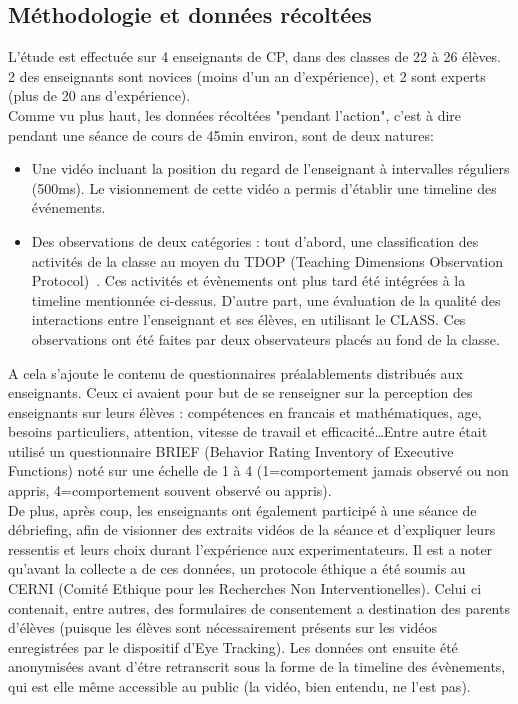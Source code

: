 \documentclass{article}
\begin{document}
\subsection{Méthodologie et données récoltées}
L'étude est effectuée sur 4 enseignants de CP, dans des classes de 22 à 26 élèves. 2 des enseignants sont novices (moins d'un an d'expérience), et 2 sont experts (plus de 20 ans d'expérience).\\
Comme vu plus haut, les données récoltées "pendant l'action", c'est à dire pendant une séance de cours de 45min environ, sont de deux natures:
\begin{itemize}
  \item Une vidéo incluant la position du regard de l'enseignant à intervalles réguliers (500ms). Le visionnement de cette vidéo a permis d'établir une timeline des événements.
  \item Des observations de deux catégories : tout d'abord, une classification des activités de la classe au moyen du TDOP (Teaching Dimensions Observation Protocol)~\cite{TDOP}. Ces activités et évènements ont plus tard été intégrées à la timeline mentionnée ci-dessus. D'autre part, une évaluation de la qualité des interactions entre l'enseignant et ses élèves, en utilisant le CLASS. Ces observations ont été faites par deux observateurs placés au fond de la classe.
\end{itemize}
A cela s'ajoute le contenu de questionnaires préalablements distribués aux enseignants. Ceux ci avaient pour but de se renseigner sur la perception des enseignants sur leurs élèves : compétences en francais et mathématiques, age, besoins particuliers, attention, vitesse de travail et efficacité\ldots Entre autre était utilisé un questionnaire BRIEF (Behavior Rating Inventory of Executive Functions) noté sur une échelle de 1 à 4 (1=comportement jamais observé ou non appris, 4=comportement souvent observé ou appris).\\
De plus, après coup, les enseignants ont également participé à une séance de débriefing, afin de visionner des extraits vidéos de la séance et d'expliquer leurs ressentis et leurs choix durant l'expérience aux experimentateurs.
Il est a noter qu'avant la collecte a de ces données, un protocole éthique a été soumis au CERNI (Comité Ethique pour les Recherches Non Interventionelles). Celui ci contenait, entre autres, des formulaires de consentement a destination des parents d'élèves (puisque les élèves sont nécessairement présents sur les vidéos enregistrées par le dispositif d'Eye Tracking). Les données ont ensuite été anonymisées avant d'étre retranscrit sous la forme de la timeline des évènements, qui est elle même accessible au public (la vidéo, bien entendu, ne l'est pas).
\end{document}
